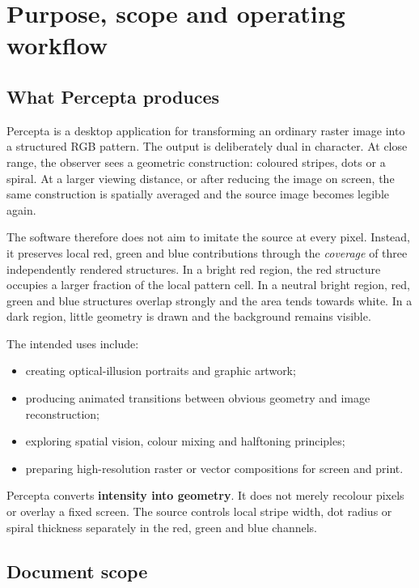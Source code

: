\section{Purpose, scope and operating workflow}

\subsection{What Percepta produces}

Percepta is a desktop application for transforming an ordinary raster image into a structured RGB pattern. The output is deliberately dual in character. At close range, the observer sees a geometric construction: coloured stripes, dots or a spiral. At a larger viewing distance, or after reducing the image on screen, the same construction is spatially averaged and the source image becomes legible again.

The software therefore does not aim to imitate the source at every pixel. Instead, it preserves local red, green and blue contributions through the \emph{coverage} of three independently rendered structures. In a bright red region, the red structure occupies a larger fraction of the local pattern cell. In a neutral bright region, red, green and blue structures overlap strongly and the area tends towards white. In a dark region, little geometry is drawn and the background remains visible.

The intended uses include:

\begin{itemize}
  \item creating optical-illusion portraits and graphic artwork;
  \item producing animated transitions between obvious geometry and image reconstruction;
  \item exploring spatial vision, colour mixing and halftoning principles;
  \item preparing high-resolution raster or vector compositions for screen and print.
\end{itemize}

\begin{principlebox}
Percepta converts \textbf{intensity into geometry}. It does not merely recolour pixels or overlay a fixed screen. The source controls local stripe width, dot radius or spiral thickness separately in the red, green and blue channels.
\end{principlebox}

\subsection{Document scope}


